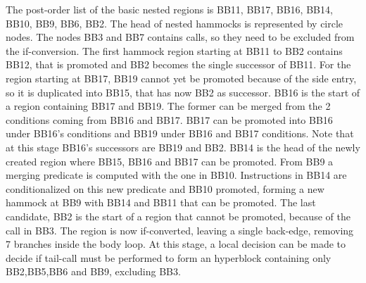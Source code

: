  The post-order list of the basic nested regions is {BB11, BB17, BB16, BB14, BB10, BB9, BB6, BB2}. The head of nested hammocks is represented by circle nodes. The nodes BB3 and BB7 contains calls, so they need to be excluded from the if-conversion.
The first hammock region starting at BB11 to BB2 contains BB12, that is promoted and BB2 becomes the single successor of BB11. 
For the region starting at BB17, BB19 cannot yet be promoted because of the side entry, so it is duplicated into BB15, that has now BB2 as successor.
BB16 is the start of a region containing BB17 and BB19. The former can be merged from the 2 conditions coming from BB16 and BB17. BB17 can be promoted into BB16 under BB16's conditions and BB19 under BB16 and BB17 conditions. Note that at this stage BB16's successors are BB19 and BB2.
BB14 is the head of the newly created region where BB15, BB16 and BB17 can be promoted. From BB9 a merging predicate is computed with the one in BB10. Instructions in BB14 are conditionalized on this new predicate and BB10 promoted, forming a new hammock at BB9 with BB14 and BB11 that can be promoted. The last candidate, BB2 is the start of a region that cannot be promoted, because of the call in BB3.
The region is now if-converted, leaving a single back-edge, removing 7 branches inside the body loop. At this stage, a local decision can be made to decide if tail-call must be performed to form an hyperblock containing only BB2,BB5,BB6 and BB9, excluding BB3. 

